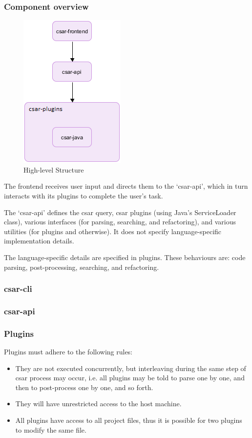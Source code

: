 \documentclass[12pt, letterpaper]{article}
\begin{document}
\subsubsection{Component overview}
\begin{figure}[!hb]
  \centering
  \caption{High-level Structure}
  \includegraphics{figure-1}
\end{figure}

The frontend receives user input and directs them to the `csar-api', which in turn interacts with its plugins to complete the user's task.

The `csar-api' defines the csar query, csar plugins (using Java's ServiceLoader class), various interfaces (for parsing, searching, and refactoring), and various utilities (for plugins and otherwise).
It does not specify language-specific implementation details.

The language-specific details are specified in plugins.
These behaviours are: code parsing, post-processing, searching, and refactoring.

\subsubsection{csar-cli}

\subsubsection{csar-api}

\subsubsection{Plugins}
Plugins must adhere to the following rules:
\begin{itemize}
  \item They are not executed concurrently, but interleaving during the same step of csar process may occur, i.e. all plugins may be told to parse one by one, and then to post-process one by one, and so forth.
  \item They will have unrestricted access to the host machine.
  \item All plugins have access to all project files, thus it is possible for two plugins to modify the same file.
\end{itemize}
\end{document}
